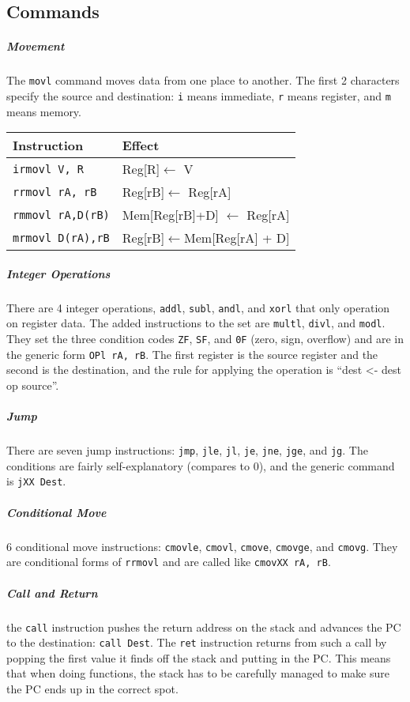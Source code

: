\documentclass[11pt]{article}
\begin{document}
	\subsection{Commands}
	
	\subparagraph{Movement} The \verb|movl| command moves data from one place to another. The first 2 characters specify the source and destination: \verb|i| means immediate, \verb|r| means register, and \verb|m| means memory.
	\begin{center}
	\begin{tabular}{l|l}
		Instruction	&	Effect\\\hline
		
		\verb|irmovl V, R|	& Reg[R]$\leftarrow$ V\\
		\verb|rrmovl rA, rB|	&	Reg[rB]$\leftarrow$ Reg[rA]\\
		\verb|rmmovl rA,D(rB)|	&	Mem[Reg[rB]+D] $\leftarrow$ Reg[rA]\\
		\verb|mrmovl D(rA),rB|	&	Reg[rB]$\leftarrow$Mem[Reg[rA] + D]\\
	\end{tabular}
	\end{center}
	
	\subparagraph{Integer Operations} There are 4 integer operations,
	\verb|addl|, \verb|subl|, \verb|andl|, and \verb|xorl| that only operation
	on register data. The added instructions to the set are \verb|multl|,
	\verb|divl|, and \verb|modl|. They set the three condition codes \verb|ZF|, \verb|SF|,
	and \verb|0F| (zero, sign, overflow) and are in the generic form \verb|OPl rA, rB|. The first register is the source register and the second is the
	destination, and the rule for applying the operation is ``dest <- dest op
	source''.
	
	\subparagraph{Jump} There are seven jump instructions: \verb|jmp|,
	\verb|jle|, \verb|jl|, \verb|je|, \verb|jne|, \verb|jge|, and \verb|jg|. The
	conditions are fairly self-explanatory (compares to 0), and the generic command is \verb|jXX Dest|.
	
	\subparagraph{Conditional Move}6 conditional move instructions: \verb|cmovle|, \verb|cmovl|, \verb|cmove|, \verb|cmovge|, and \verb|cmovg|. They are conditional forms of \verb|rrmovl| and are called like \verb|cmovXX rA, rB|.
	
	\subparagraph{Call and Return} the \verb|call| instruction pushes the return
	address on the stack and advances the PC to the destination: \verb|call Dest|. The \verb|ret| instruction returns from such a call by popping the
	first value it finds off the stack and putting in the PC. This means that
	when doing functions, the stack has to be carefully managed to make sure the
	PC ends up in the correct spot.
	
\end{document}
